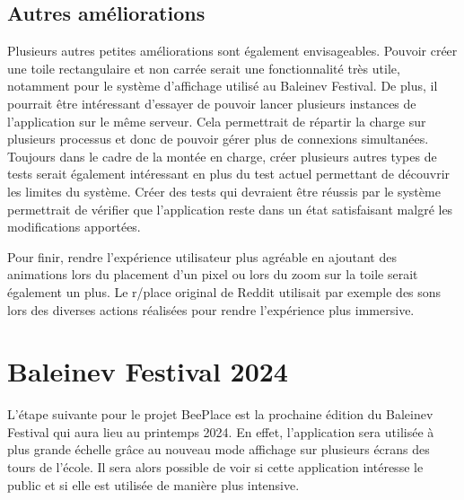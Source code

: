\subsection{Autres améliorations}

Plusieurs autres petites améliorations sont également envisageables. Pouvoir créer une toile rectangulaire et non carrée serait une fonctionnalité très utile, notamment pour le système d'affichage utilisé au Baleinev Festival. De plus, il pourrait être intéressant d'essayer de pouvoir lancer plusieurs instances de l'application sur le même serveur. Cela permettrait de répartir la charge sur plusieurs processus et donc de pouvoir gérer plus de connexions simultanées. Toujours dans le cadre de la montée en charge, créer plusieurs autres types de tests serait également intéressant en plus du test actuel permettant de découvrir les limites du système. Créer des tests qui devraient être réussis par le système permettrait de vérifier que l'application reste dans un état satisfaisant malgré les modifications apportées.

Pour finir, rendre l'expérience utilisateur plus agréable en ajoutant des animations lors du placement d'un pixel ou lors du zoom sur la toile serait également un plus. Le r/place original de Reddit utilisait par exemple des sons lors des diverses actions réalisées pour rendre l'expérience plus immersive.

\section{Baleinev Festival 2024}

L'étape suivante pour le projet BeePlace est la prochaine édition du Baleinev Festival qui aura lieu au printemps 2024. En effet, l'application sera utilisée à plus grande échelle grâce au nouveau mode affichage sur plusieurs écrans des tours de l'école. Il sera alors possible de voir si cette application intéresse le public et si elle est utilisée de manière plus intensive.

\vfil
\hspace{8cm}\makeatletter\@author\makeatother\par
\hspace{8cm}\begin{minipage}{5cm}
  \printsignature
\end{minipage}
